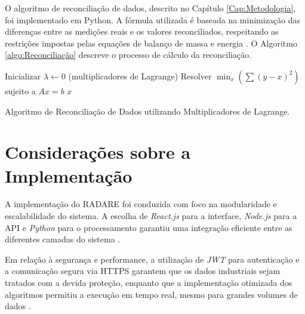 O algoritmo de reconciliação de dados, descrito no Capítulo \ref{Cap:Metodologia}, foi implementado em Python. A fórmula utilizada é baseada na minimização das diferenças entre as medições reais e os valores reconciliados, respeitando as restrições impostas pelas equações de balanço de massa e energia \cite{massbalance2024}. O Algoritmo \ref{algo:Reconciliação} descreve o processo de cálculo da reconciliação.

\begin{algorithm}
Inicializar $\lambda \leftarrow 0$ (multiplicadores de Lagrange)\;
Resolver $\min_x \left( \sum (y - x)^2 \right)$ sujeito a $Ax = b$\;
\Retorna $x$\;
\caption{Algoritmo de Reconciliação de Dados utilizando Multiplicadores de Lagrange.}
\label{algo:Reconciliação}
\end{algorithm}

\section{Considerações sobre a Implementação}
\label{Sec:ConsideracoesImplementacao}

A implementação do RADARE foi conduzida com foco na modularidade e escalabilidade do sistema. A escolha de \textit{React.js} para a interface, \textit{Node.js} para a API e \textit{Python} para o processamento garantiu uma integração eficiente entre as diferentes camadas do sistema \cite{reactpythonintegration2024}.

Em relação à segurança e performance, a utilização de \textit{JWT} para autenticação e a comunicação segura via HTTPS garantem que os dados industriais sejam tratados com a devida proteção, enquanto que a implementação otimizada dos algoritmos permitiu a execução em tempo real, mesmo para grandes volumes de dados \cite{performanceoptimization2024}.
